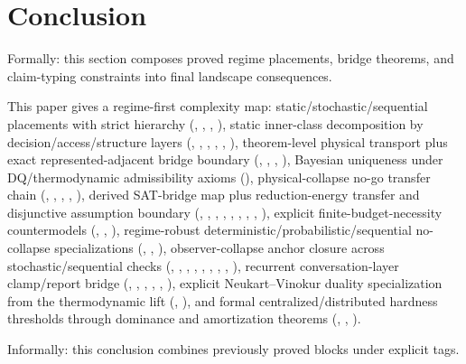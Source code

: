 \section{Conclusion}

Formally: this section composes proved regime placements, bridge theorems, and claim-typing constraints into final landscape consequences.

This paper gives a regime-first complexity map: static/stochastic/sequential placements with strict hierarchy (, , , ), static inner-class decomposition by decision/access/structure layers (, , , , , ), theorem-level physical transport plus exact represented-adjacent bridge boundary (, , , ), Bayesian uniqueness under DQ/thermodynamic admissibility axioms (), physical-collapse no-go transfer chain (, , , , ), derived SAT-bridge map plus reduction-energy transfer and disjunctive assumption boundary (, , , , , , , , ), explicit finite-budget-necessity countermodels (, , ), regime-robust deterministic/probabilistic/sequential no-collapse specializations (, , ), observer-collapse anchor closure across stochastic/sequential checks (, , , , , , , , ), recurrent conversation-layer clamp/report bridge (, , , , , ), explicit Neukart--Vinokur duality specialization from the thermodynamic lift (, ), and formal centralized/distributed hardness thresholds through dominance and amortization theorems (, , ).

Informally: this conclusion combines previously proved blocks under explicit tags.


